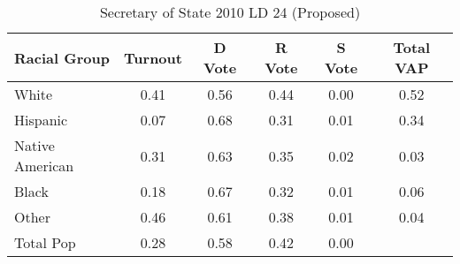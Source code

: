 \begin{table}[htb]
\begin{center}
\caption{Secretary of State 2010 LD 24 (Proposed)}
\label{sos10_vap_ld_24}
\begin{tabular}{lccccc}
  \hline
Racial Group & Turnout & D Vote & R Vote & S Vote & Total VAP \\ 
  \hline
White & 0.41 & 0.56 & 0.44 & 0.00 & 0.52 \\ 
  Hispanic & 0.07 & 0.68 & 0.31 & 0.01 & 0.34 \\ 
  Native American & 0.31 & 0.63 & 0.35 & 0.02 & 0.03 \\ 
  Black & 0.18 & 0.67 & 0.32 & 0.01 & 0.06 \\ 
  Other & 0.46 & 0.61 & 0.38 & 0.01 & 0.04 \\ 
  Total Pop & 0.28 & 0.58 & 0.42 & 0.00 &  \\ 
   \hline
\end{tabular}
\end{center}
\end{table}
